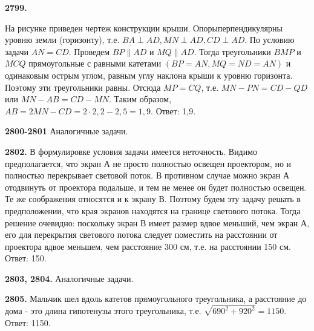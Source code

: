 \textbf{2799.}
\begin{figure}[h]
\end{figure}
На рисунке приведен чертеж конструкции крыши. Опоры\newline перпендикулярны уровню земли (горизонту), т.е. $BA\perp AD,$\newline$MN\perp AD, CD\perp AD$. По условию задачи $AN=CD$. Проведем $BP\|AD$ и $MQ\|AD$. Тогда треугольники $BMP$ и $MCQ$ прямоугольные с равными катетами $(BP=AN, MQ=ND=AN)$ и одинаковым острым углом, равным углу наклона крыши к уровню горизонта. Поэтому эти треугольники равны.
Отсюда $MP=CQ$, т.е. $MN-PN=CD-QD$ или $MN-AB=CD-MN$. Таким образом, $AB=2MN-CD=2\cdot2,2-2,5=1,9.$\newline \null \hspace*{\fill} Ответ: 1,9. 

\textbf{2800-2801} Аналогичные задачи.

\textbf{2802.} В формулировке условия задачи имеется неточность. Видимо предполагается, что экран А не просто полностью освещен проектором, но и полностью перекрывает световой поток. В противном случае можно экран А отодвинуть от проектора подальше, и тем не менее он будет полностью освещен. Те же соображения относятся и к экрану В. Поэтому будем эту задачу решать  в предположении, что края экранов находятся на границе светового потока. Тогда решение очевидно: поскольку экран В имеет размер вдвое меньший, чем экран А, его для перекрытия светового потока следует поместить на расстоянии от проектора вдвое меньшем, чем расстояние 300 см, т.е.  на расстоянии 150 см.        \null \hspace*{\fill} Ответ: 150. 

\textbf{2803, 2804.} Аналогичные задачи.

\textbf{2805.} Мальчик шел вдоль катетов прямоугольного треугольника, а расстояние до дома - это длина гипотенузы этого треугольника, т.е. $\sqrt{690^2 + 920^2} = 1150.$ \newline \null \hspace*{\fill} Ответ: 1150. 

